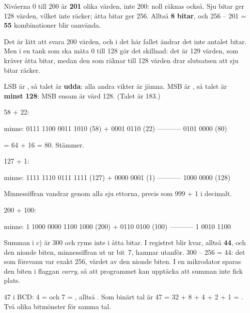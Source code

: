 Nivåerna 0 till 200 är \textbf{201} olika värden, inte 200: noll räknas också. Sju bitar ger
128 värden, vilket inte räcker; åtta bitar ger 256. Alltså \textbf{8 bitar}, och 256 -- 201 =
\textbf{55} kombinationer blir oanvända.

Det är lätt att svara 200 värden, och i det här fallet ändrar det inte antalet bitar. Men i en tank
som ska mäta 0 till 128 gör det skillnad: det är 129 värden, som kräver åtta bitar, medan den som
räknar till 128 värden drar slutsatsen att sju bitar räcker.

LSB är , så talet är \textbf{udda}: alla andra vikter är jämna. MSB är , så
talet är \textbf{minst 128}: MSB ensam är värd 128. (Talet är 183.)

58 + 22:

\begin{textdrawing}
  minne:   0111 1100
           0011 1010     (58)
         + 0001 0110     (22)
         -----------
           0101 0000     (80)
\end{textdrawing}

\noindent{} = 64 + 16 = 80. Stämmer.

127 + 1:

\begin{textdrawing}
  minne:   1111 1110
           0111 1111     (127)
         + 0000 0001     (1)
         -----------
           1000 0000     (128)
\end{textdrawing}

\noindent Minnessiffran vandrar genom alla sju ettorna, precis som 999 + 1 i decimalt.

200 + 100:

\begin{textdrawing}
  minne: 1 1000 0000
           1100 1000     (200)
         + 0110 0100     (100)
         -----------
         1 0010 1100
\end{textdrawing}

Summan i c) är 300 och ryms inte i åtta bitar. I registret blir  kvar, alltså
\textbf{44}, och den nionde biten, minnessiffran ut ur bit~7, hamnar utanför. 300 -- 256 = 44: det
som försvann var exakt 256, värdet av den nionde biten. I en mikrodator sparas den biten i flaggan
\emph{carry}, så att programmet kan upptäcka att summan inte fick plats.

47 i BCD: 4 =  och 7 = , alltså \textbf{}. Som binärt
tal är 47 = 32 + 8 + 4 + 2 + 1 = \textbf{}. Två olika bitmönster för samma tal.

